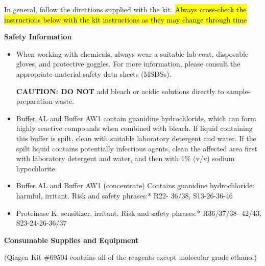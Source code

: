 \documentclass[11pt, oneside]{article}
\begin{document}
		In general, follow the directions supplied with the kit.  \hl{Always cross-check the instructions below with the kit instructions as they may change through time}
	
		{\bf Safety Information}

		\begin{itemize}
		\itemsep0mm
		 	\item When working with chemicals, always wear a suitable lab coat, disposable gloves, and protective goggles. For more information, 				please consult the appropriate material safety data sheets (MSDSs).

			\vspace{3mm}
			{\bf CAUTION: DO NOT} add bleach or acidic solutions directly to sample-preparation waste.
			\vspace{3mm}

			\item Buffer AL and Buffer AW1 contain guanidine hydrochloride, which can form highly reactive compounds when combined with bleach. If 			liquid containing this buffer is spilt, clean with suitable laboratory detergent and water. If the spilt liquid contains potentially infectious agents, 			clean the affected area first with laboratory detergent and water, and then with 1\% (v/v) sodium hypochlorite.
			\item Buffer AL and Buffer AW1 (concentrate) Contains guanidine hydrochloride: harmful, irritant. Risk and safety phrases:* R22- 36/38, 				S13-26-36-46
			\item Proteinase K: sensitizer, irritant. Risk and safety phrases:* R36/37/38-
			42/43, S23-24-26-36/37
		\end{itemize}

		\vspace{5mm}

		{\bf Consumable Supplies and Equipment}

		(Qiagen Kit \#69504 contains all of the reagents except molecular grade ethanol)
\end{document}
